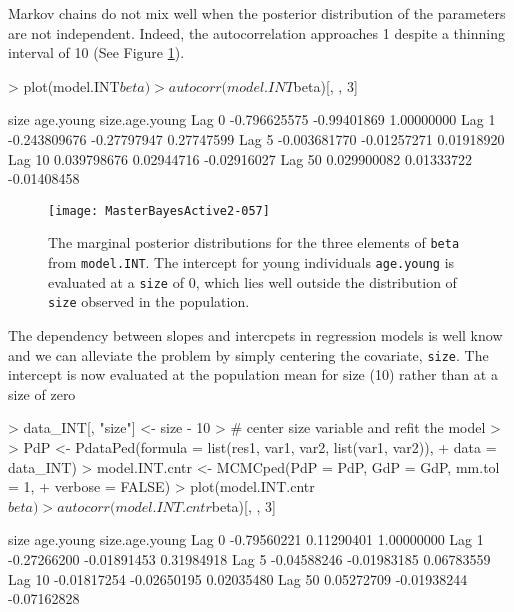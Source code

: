 \documentclass{article}
\begin{document}
Markov chains do not mix well when the posterior distribution of the parameters are not independent. Indeed, the autocorrelation approaches 1 despite a thinning interval of 10 (See Figure \ref{INT-fig}).  

\begin{Schunk}
\begin{Sinput}
> plot(model.INT$beta)
> autocorr(model.INT$beta)[, , 3]
\end{Sinput}
\begin{Soutput}
               size   age.young size.age.young
Lag 0  -0.796625575 -0.99401869     1.00000000
Lag 1  -0.243809676 -0.27797947     0.27747599
Lag 5  -0.003681770 -0.01257271     0.01918920
Lag 10  0.039798676  0.02944716    -0.02916027
Lag 50  0.029900082  0.01333722    -0.01408458
\end{Soutput}
\end{Schunk}



\begin{figure}[!h]
\begin{center}
\texttt{[image: MasterBayesActive2-057]}
\end{center}
\caption{The marginal posterior distributions for the three elements of \texttt{beta} from \texttt{model.INT}.  The intercept for young individuals \texttt{age.young} is evaluated at a \texttt{size} of 0, which lies well outside the distribution of \texttt{size} observed in the population.}
\label{INT-fig}
\end{figure}

The dependency between slopes and intercpets in regression models is well know and we can alleviate the problem by simply centering the covariate, \texttt{size}.  The intercept is now evaluated at the population mean for size (10) rather than at a size of zero

\begin{Schunk}
\begin{Sinput}
> data_INT[, "size"] <- size - 10
> # center size variable and refit the model
>
> PdP <- PdataPed(formula = list(res1, var1, var2, list(var1, var2)), 
+     data = data_INT)
> model.INT.cntr <- MCMCped(PdP = PdP, GdP = GdP, mm.tol = 1,
+     verbose = FALSE)
> plot(model.INT.cntr$beta)
> autocorr(model.INT.cntr$beta)[, , 3]
\end{Sinput}
\begin{Soutput}
              size   age.young size.age.young
Lag 0  -0.79560221  0.11290401     1.00000000
Lag 1  -0.27266200 -0.01891453     0.31984918
Lag 5  -0.04588246 -0.01983185     0.06783559
Lag 10 -0.01817254 -0.02650195     0.02035480
Lag 50  0.05272709 -0.01938244    -0.07162828
\end{Soutput}
\end{Schunk}
\end{document}
